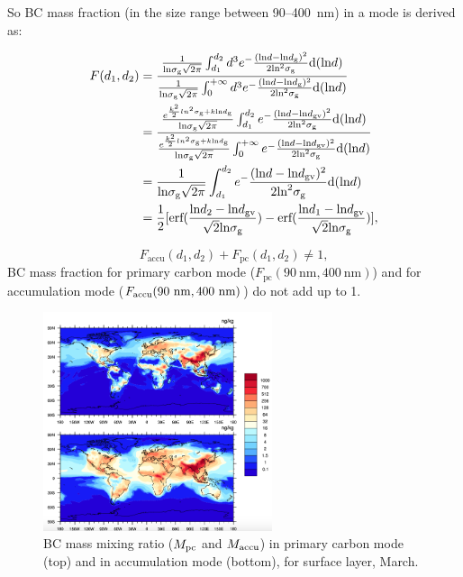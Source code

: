 \documentclass[11pt]{article}
\begin{document}
	So BC mass fraction (in the size range between 90--400~nm)
	in a mode is derived as:
	
	\begin{align*}
	F(d_{1}, d_{2}) &= \frac{\frac{1}{\text{ln}\sigma_{\text{g}}\sqrt{2\pi}}\int_{d_{1}}^{d_{2}}d^3e^-\frac{(\text{ln}d - \text{ln}d_{\rm g})^2}{2\text{ln}^2\sigma_{\text{g}}}\text{d}(\text{ln}d)}
	{\frac{1}{\text{ln}\sigma_{\text{g}}\sqrt{2\pi}}\int_{0}^{+\infty}d^3e^-\frac{(\text{ln}d - \text{ln}d_{\rm g})^2}{2\text{ln}^2\sigma_{\text{g}}}\text{d}(\text{ln}d)}  \\
	&=\frac{\frac{e^{\frac{k^2}{2}ln^2\sigma_{\rm g}+k\text{ln}d_{\rm g}}}{\text{ln}\sigma_{\text{g}}\sqrt{2\pi}}\int_{d_{1}}^{d_{2}}e^-\frac{(\text{ln}d - \text{ln}d_{\text{gv}})^2}{2\text{ln}^2\sigma_{\text{g}}}\text{d}(\text{ln}d)}{\frac{e^{\frac{k^2}{2}ln^2\sigma_{\rm g}+k\text{ln}d_{\rm g}}}{\text{ln}\sigma_{\text{g}}\sqrt{2\pi}}\int_{0}^{+\infty}e^-\frac{(\text{ln}d - \text{ln}d_{\text{gv}})^2}{2\text{ln}^2\sigma_{\text{g}}}\text{d}(\text{ln}d)}\\
	&=\frac{1}{\text{ln}\sigma_{\text{g}}\sqrt{2\pi}}\int_{d_{1}}^{d_{2}}e^-\frac{(\text{ln}d - \text{ln}d_{\text{gv}})^2}{2\text{ln}^2\sigma_{\text{g}}}\text{d}(\text{ln}d) \\
	&=\frac{1}{2}[\text{erf}(\frac{\text{ln}d_{2} - \text{ln}d_{\text{gv}}}{\sqrt{2}\text{ln}\sigma_{\rm g}})-\text{erf}(\frac{\text{ln}d_{1} - \text{ln}d_{\text{gv}}}{\sqrt{2}\text{ln}\sigma_{\rm g}})],
	\end{align*}
	
	\[F_{\text{accu}}(d_{1}, d_{2}) + F_{\text{pc}}(d_{1}, d_{2}) \neq 1,\]
	BC mass fraction for primary carbon mode ($F_{\text{pc}}(90~\text{nm}, 400~\text{nm})$) and for accumulation mode ($F_{\text{accu}}(90~\rm nm, 400~\rm nm)$) do not add up to 1.
	
	
	\begin{figure}[!h] 
		\begin{center}
			\includegraphics[width = 0.6\textwidth]{Rplot01}
			\caption[]{\label{fig_P1}BC mass mixing ratio ($M_{\rm pc}$ and $M_{\rm accu}$) in primary carbon mode (top) and in accumulation mode (bottom), for surface layer, March.}
		\end{center}
	\end{figure}
	
\end{document}
